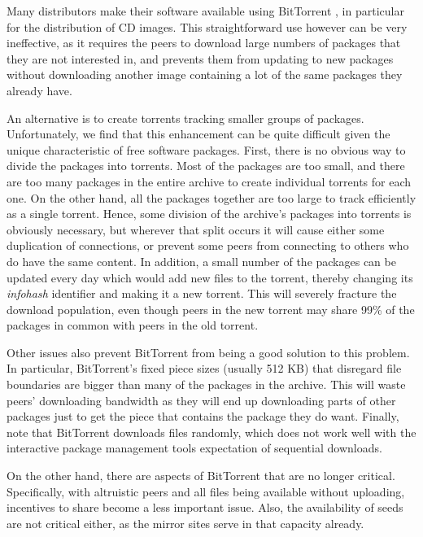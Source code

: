 \documentclass[conference]{IEEEtran}
\begin{document}
Many distributors make their software available using
BitTorrent \cite{COHEN03}, in particular for the distribution of CD
images. This straightforward use however can be very ineffective, as it requires the
peers to download large numbers of packages that they are not
interested in, and prevents them from updating to new packages
without downloading another image containing a lot of the same
packages they already have.

An alternative is to create torrents tracking smaller groups of packages. Unfortunately, we find that this enhancement can be
quite difficult given the unique characteristic of free software packages.
First, there is no obvious way to divide the packages into torrents.
Most of the packages are too small, and there are too many packages
in the entire archive to create individual torrents for each one.
On the other hand, all the packages together are too large to track
efficiently as a single torrent. Hence, some division of the archive's
packages into torrents is obviously necessary, but wherever that
split occurs it will cause either some duplication of connections,
or prevent some peers from connecting to others who do have the same
content. In addition, a small number of the packages can be updated every
day which would add new files to the torrent, thereby changing its
\emph{infohash} identifier and making it a new torrent. This will
severely fracture the download population, even though peers in the
new torrent may share 99\% of the packages in common with peers in the
old torrent.

Other issues also prevent BitTorrent from being a good solution to
this problem. In particular, BitTorrent's fixed piece sizes (usually 512 KB) that disregard file
boundaries are bigger than many of the packages in the archive. This
will waste peers' downloading bandwidth as they will end up
downloading parts of other packages just to get the piece that
contains the package they do want.
Finally, note that BitTorrent downloads files
randomly, which does not work well with the interactive package
management tools expectation of sequential downloads.

On the other hand, there are aspects of BitTorrent that are no
longer critical. Specifically, with altruistic peers
and all files being available without uploading, incentives to share
become a less important issue. Also, the availability of seeds are
not critical either, as the mirror sites serve in that capacity
already.

\end{document}
